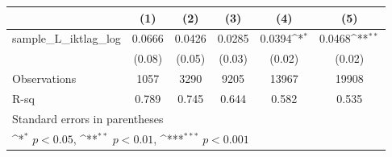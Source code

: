 {
\def\sym#1{\ifmmode^{#1}\else\(^{#1}\)\fi}
\begin{tabular}{l*{5}{c}}
\hline\hline
          &\multicolumn{1}{c}{(1)}         &\multicolumn{1}{c}{(2)}         &\multicolumn{1}{c}{(3)}         &\multicolumn{1}{c}{(4)}         &\multicolumn{1}{c}{(5)}         \\
\hline
sample\_L\_iktlag\_log&   0.0666         &   0.0426         &   0.0285         &   0.0394\sym{*}  &   0.0468\sym{**} \\
          &   (0.08)         &   (0.05)         &   (0.03)         &   (0.02)         &   (0.02)         \\
\hline
Observations&     1057         &     3290         &     9205         &    13967         &    19908         \\
R-sq      &    0.789         &    0.745         &    0.644         &    0.582         &    0.535         \\
\hline\hline
\multicolumn{6}{l}{\footnotesize Standard errors in parentheses}\\
\multicolumn{6}{l}{\footnotesize \sym{*} \(p<0.05\), \sym{**} \(p<0.01\), \sym{***} \(p<0.001\)}\\
\end{tabular}
}
